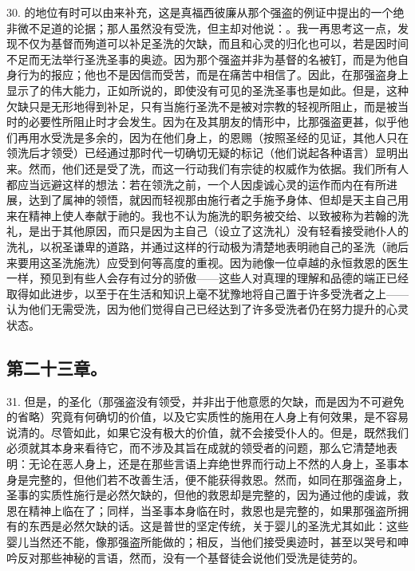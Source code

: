 30. 的地位有时可以由来补充，这是真福西彼廉从那个强盗的例证中提出的一个绝非微不足道的论据；那人虽然没有受洗，但主却对他说：。我一再思考这一点，发现不仅为基督而殉道可以补足圣洗的欠缺，而且和心灵的归化也可以，若是因时间不足而无法举行圣洗圣事的奥迹。因为那个强盗并非为基督的名被钉，而是为他自身行为的报应；他也不是因信而受苦，而是在痛苦中相信了。因此，在那强盗身上显示了的伟大能力，正如所说的，即使没有可见的圣洗圣事也是如此。但是，这种欠缺只是无形地得到补足，只有当施行圣洗不是被对宗教的轻视所阻止，而是被当时的必要性所阻止时才会发生。因为在及其朋友的情形中，比那强盗更甚，似乎他们再用水受洗是多余的，因为在他们身上，的恩赐（按照圣经的见证，其他人只在领洗后才领受）已经通过那时代一切确切无疑的标记（他们说起各种语言）显明出来。然而，他们还是受了洗，而这一行动我们有宗徒的权威作为依据。我们所有人都应当远避这样的想法：若在领洗之前，一个人因虔诚心灵的运作而内在有所进展，达到了属神的领悟，就因而轻视那由施行者之手施予身体、但却是天主自己用来在精神上使人奉献于祂的。我也不认为施洗的职务被交给、以致被称为若翰的洗礼，是出于其他原因，而只是因为主自己（设立了这洗礼）没有轻看接受祂仆人的洗礼，以祝圣谦卑的道路，并通过这样的行动极为清楚地表明祂自己的圣洗（祂后来要用这圣洗施洗）应受到何等高度的重视。因为祂像一位卓越的永恒救恩的医生一样，预见到有些人会存有过分的骄傲——这些人对真理的理解和品德的端正已经取得如此进步，以至于在生活和知识上毫不犹豫地将自己置于许多受洗者之上——认为他们无需受洗，因为他们觉得自己已经达到了许多受洗者仍在努力提升的心灵状态。\par


\subsection{第二十三章。}

31. 但是，的圣化（那强盗没有领受，并非出于他意愿的欠缺，而是因为不可避免的省略）究竟有何确切的价值，以及它实质性的施用在人身上有何效果，是不容易说清的。尽管如此，如果它没有极大的价值，就不会接受仆人的。但是，既然我们必须就其本身来看待它，而不涉及其旨在成就的领受者的问题，那么它清楚地表明：无论在恶人身上，还是在那些言语上弃绝世界而行动上不然的人身上，圣事本身是完整的，但他们若不改善生活，便不能获得救恩。然而，如同在那强盗身上，圣事的实质性施行是必然欠缺的，但他的救恩却是完整的，因为通过他的虔诚，救恩在精神上临在了；同样，当圣事本身临在时，救恩也是完整的，如果那强盗所拥有的东西是必然欠缺的话。这是普世的坚定传统，关于婴儿的圣洗尤其如此：这些婴儿当然还不能，像那强盗所能做的；相反，当他们接受奥迹时，甚至以哭号和呻吟反对那些神秘的言语，然而，没有一个基督徒会说他们受洗是徒劳的。\par


